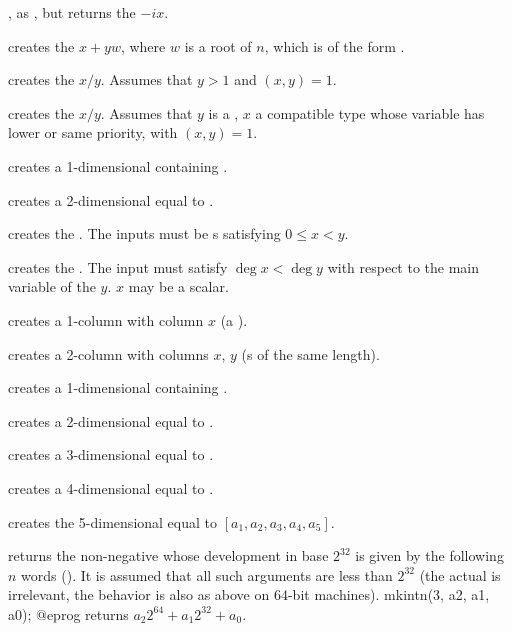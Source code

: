 , as , but returns the 
$-ix$.

 creates the  $x + yw$,
where $w$ is a root of $n$, which is of the form .

 creates the  $x/y$. Assumes that
$y > 1$ and $(x,y) = 1$.

 creates the  $x/y$. Assumes
that $y$ is a , $x$ a compatible type whose variable has lower
or same priority, with $(x,y) = 1$.

 creates a 1-dimensional  containing .

 creates a 2-dimensional  equal to
\kbd{[x,y]}.

 creates the  .
The inputs must be s satisfying $0 \leq x < y$.

 creates the  .
The input must satisfy $\deg x < \deg y$ with respect to the main variable of
the  $y$. $x$ may be a scalar.

 creates a 1-column  with column $x$
(a ).

 creates a 2-column  with columns
$x$, $y$ (s of the same length).

 creates a 1-dimensional  containing .

 creates a 2-dimensional  equal to
\kbd{[x,y]}.

 creates a 3-dimensional 
equal to \kbd{[x,y,z]}.

 creates a 4-dimensional 
equal to \kbd{[x,y,z,t]}.

 creates the
5-dimensional  equal to $[a_1,a_2,a_3,a_4,a_5]$.

\smallskip

 returns the non-negative  whose
development in base $2^{32}$ is given by the following $n$ words
(). It is assumed that all such arguments are less than
$2^{32}$ (the actual  is irrelevant, the behavior is also
as above on $64$-bit machines).
\bprog
  mkintn(3, a2, a1, a0);
@eprog
\noindent returns $a_2 2^{64} + a_1 2^{32} + a_0$.

